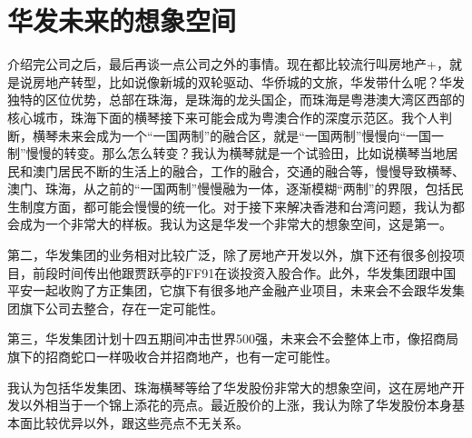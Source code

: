 \documentclass[a4paper,12pt,lang=cn,fontset = windows]{elegantpaper} %
\begin{document}
\section{华发未来的想象空间}

介绍完公司之后，最后再谈一点公司之外的事情。现在都比较流行叫房地产+，就是说房地产转型，比如说像新城的双轮驱动、华侨城的文旅，华发带什么呢？华发独特的区位优势，总部在珠海，是珠海的龙头国企，而珠海是粤港澳大湾区西部的核心城市，珠海下面的横琴接下来可能会成为粤澳合作的深度示范区。我个人判断，横琴未来会成为一个“一国两制”的融合区，就是“一国两制”慢慢向“一国一制”慢慢的转变。那么怎么转变？我认为横琴就是一个试验田，比如说横琴当地居民和澳门居民不断的生活上的融合，工作的融合，交通的融合等，慢慢导致横琴、澳门、珠海，从之前的“一国两制”慢慢融为一体，逐渐模糊“两制”的界限，包括民生制度方面，都可能会慢慢的统一化。对于接下来解决香港和台湾问题，我认为都会成为一个非常大的样板。我认为这是华发一个非常大的想象空间，这是第一。

第二，华发集团的业务相对比较广泛，除了房地产开发以外，旗下还有很多创投项目，前段时间传出他跟贾跃亭的FF91在谈投资入股合作。此外，华发集团跟中国平安一起收购了方正集团，它旗下有很多地产金融产业项目，未来会不会跟华发集团旗下公司去整合，存在一定可能性。

第三，华发集团计划十四五期间冲击世界500强，未来会不会整体上市，像招商局旗下的招商蛇口一样吸收合并招商地产，也有一定可能性。

我认为包括华发集团、珠海横琴等给了华发股份非常大的想象空间，这在房地产开发以外相当于一个锦上添花的亮点。最近股价的上涨，我认为除了华发股份本身基本面比较优异以外，跟这些亮点不无关系。

\maketitle
\end{document}
